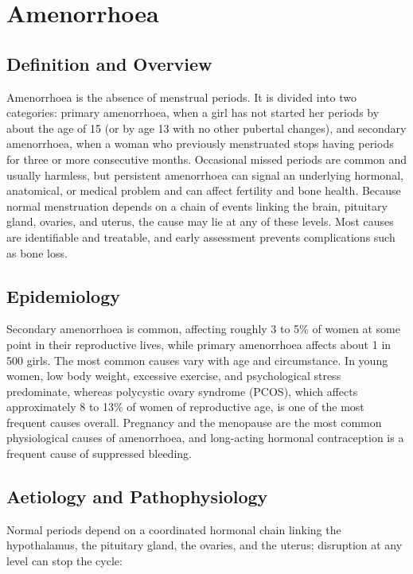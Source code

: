 \chapter{Amenorrhoea}

\section*{Definition and Overview}
Amenorrhoea is the absence of menstrual periods. It is divided into two categories: primary amenorrhoea, when a girl has not started her periods by about the age of 15 (or by age 13 with no other pubertal changes), and secondary amenorrhoea, when a woman who previously menstruated stops having periods for three or more consecutive months. Occasional missed periods are common and usually harmless, but persistent amenorrhoea can signal an underlying hormonal, anatomical, or medical problem and can affect fertility and bone health. Because normal menstruation depends on a chain of events linking the brain, pituitary gland, ovaries, and uterus, the cause may lie at any of these levels. Most causes are identifiable and treatable, and early assessment prevents complications such as bone loss.

\section*{Epidemiology}
Secondary amenorrhoea is common, affecting roughly 3 to 5\% of women at some point in their reproductive lives, while primary amenorrhoea affects about 1 in 500 girls. The most common causes vary with age and circumstance. In young women, low body weight, excessive exercise, and psychological stress predominate, whereas polycystic ovary syndrome (PCOS), which affects approximately 8 to 13\% of women of reproductive age, is one of the most frequent causes overall. Pregnancy and the menopause are the most common physiological causes of amenorrhoea, and long-acting hormonal contraception is a frequent cause of suppressed bleeding.

\section*{Aetiology and Pathophysiology}
Normal periods depend on a coordinated hormonal chain linking the hypothalamus, the pituitary gland, the ovaries, and the uterus; disruption at any level can stop the cycle:


